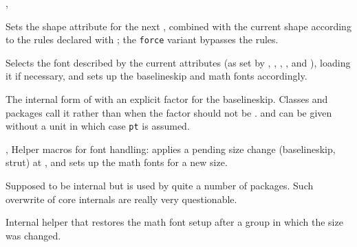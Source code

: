 \documentclass{l3in2edoc}
\begin{document}
\begin{function}[user]
  {
    \fontshape,
    \fontshapeforce
  }
  \begin{syntax}
     
  \end{syntax}
  Sets the shape attribute for the next , combined
  with the current shape according to the rules declared with
  ; the \texttt{force} variant
  bypasses the rules.
\end{function}



\begin{function}[user]
  {
    \selectfont
  }
  \begin{syntax}
  \end{syntax}
  Selects the font described by the current attributes (as set by
  , , ,
  , and ), loading it if necessary, and
  sets up the baselineskip and math fonts accordingly.
\end{function}



\begin{function}[]
  {
    \set@fontsize
  }
  \begin{syntax}
       
  \end{syntax}
  The internal form of  with an explicit factor for the
  baselineskip. Classes and packages call it rather than 
  when the factor should not be .
   and  can be given without a unit
  in which case \texttt{pt} is assumed.
\end{function}


\begin{function}[int]
  {
    \size@update,
    \glb@settings
  }
  Helper macros for font handling:  applies a pending
  size change (baselineskip, strut) at , and
   sets up the math fonts for a new size.

  Supposed to be internal but is used by quite a number of
  packages. Such overwrite of core internals are really very
  questionable.
\end{function}



\begin{function}[int]
  {
    \restglb@settings
  }
  Internal helper that restores the math font setup after a group in
  which the size was changed.
\end{function}
\end{document}
